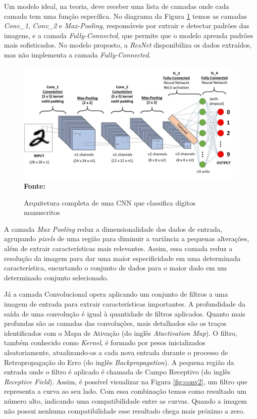 Um modelo ideal, na teoria, deve receber uma lista de camadas onde cada camada tem uma função específica. No diagrama da Figura \ref{fig:cnn} temos as camadas \textit{Conv\_1}, \textit{Conv\_2} e \textit{Max-Pooling}, responsáveis por extrair e detectar padrões das imagens, e a camada \textit{Fully-Connected}, que permite que o modelo aprenda padrões mais sofisticados. No modelo proposto, a \textit{ResNet} disponibiliza os dados extraídos, mas não implementa a camada \textit{Fully-Connected}.

\begin{figure}[ht]
 	\centering	
 	\caption[\hspace{0.1cm}Grade Computacional.]{Arquitetura completa de uma CNN que classifica dígitos manuscritos}
 	\vspace{-0.4cm}
 	\includegraphics[width=1\textwidth]{figuras/cnn.png}
 	\captionsetup{justification=centering}
	\vspace{-0.2cm}
     \\\textbf{\footnotesize Fonte: \cite{towardsdatascienceimage}}
	\label{fig:cnn}
\end{figure}

A camada \textit{Max Pooling} reduz a dimensionalidade dos dados de entrada, agrupando \textit{pixels} de uma região para diminuir a variância a pequenas alterações, além de extrair características mais relevantes. Assim, essa camada reduz a resolução da imagem para dar uma maior especificidade em uma determinada característica, encurtando o conjunto de dados para o maior dado em um determinado conjunto selecionado.

Já a camada Convolucional opera aplicando um conjunto de filtros a uma imagem de entrada para extrair características importantes. A profundidade da saída de uma convolução é igual à quantidade de filtros aplicados. Quanto mais profundas são as camadas das convoluções, mais detalhados são os traços identificados com o Mapa de Ativação (do inglês \textit{Atactivation Map}). O filtro, também conhecido como \textit{Kernel}, é formado por pesos inicializados aleatoriamente, atualizando-os a cada nova entrada durante o processo de Retropropagação do Erro (do inglês \textit{Backpropagation}). A pequena região da entrada onde o filtro é aplicado é chamada de Campo Receptivo (do inglês \textit{Receptive Field}). Assim, é possível visualizar na Figura \ref{fig:conv2}, um filtro que representa a curva ao seu lado. Com essa combinação temos como resultado um número alto, indicando uma compatibilidade entre as curvas. Quando a imagem não possui nenhuma compatibilidade esse resultado chega mais próximo a zero.

